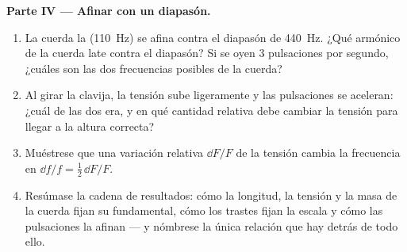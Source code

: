 \begin{problem}
\medskip
\noindent\textbf{Parte IV --- Afinar con un diapasón.}
\begin{enumerate}[resume]
  \item La cuerda la (\qty{110}{Hz}) se afina contra el diapasón de
        \qty{440}{Hz}. ¿Qué armónico de la cuerda late contra el diapasón?
        Si se oyen \qty{3}{} pulsaciones por segundo, ¿cuáles son las dos
        frecuencias posibles de la cuerda?
  \item Al girar la clavija, la tensión sube ligeramente y las
        pulsaciones se aceleran: ¿cuál de las dos era, y en qué cantidad
        relativa debe cambiar la tensión para llegar a la altura correcta?
  \item Muéstrese que una variación relativa $\dd F/F$ de la tensión
        cambia la frecuencia en $\dd f/f = \tfrac12\,\dd F/F$.
  \item Resúmase la cadena de resultados: cómo la longitud, la tensión y
        la masa de la cuerda fijan su fundamental, cómo los trastes fijan
        la escala y cómo las pulsaciones la afinan --- y nómbrese la
        única relación que hay detrás de todo ello.
\end{enumerate}
\end{problem}
